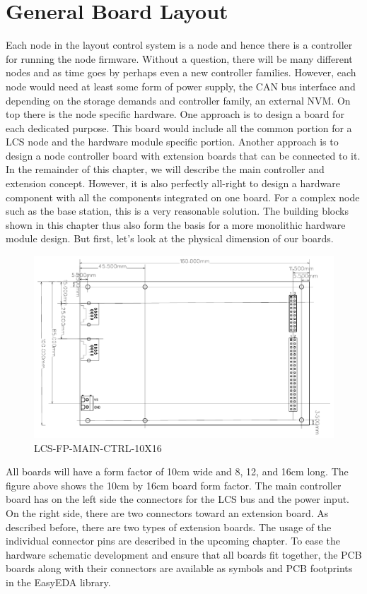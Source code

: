 \section{General Board Layout}

Each node in the layout control system is a node and hence there is a controller for running the node firmware. Without a question, there will be many different nodes and as time goes by perhaps even a new controller families. However, each node would need at least some form of power supply, the CAN bus interface and depending on the storage demands and controller family, an external NVM. On top there is the node specific hardware. One approach is to design a board for each dedicated purpose. This board would include all the common portion for a LCS node and the hardware module specific portion. Another approach is to design a node controller board with extension boards that can be connected to it. In the remainder of this chapter, we will describe the main controller and extension concept. However, it is also perfectly all-right to design a hardware component with all the components integrated on one board. For a complex node such as the base station, this is a very reasonable solution. The building blocks shown in this chapter thus also form the basis for a more monolithic hardware module design. But first, let's look at the physical dimension of our boards.

\begin{figure}[htbp]
    \centering
    \includegraphics[page=1, scale=0.7]{./Figures/LCS-FP-MAIN-CTRL-10X16.pdf}
    \caption{LCS-FP-MAIN-CTRL-10X16}
\end{figure}

All boards will have a form factor of 10cm wide and 8, 12, and 16cm long. The figure above shows the 10cm by 16cm board form factor. The main controller board has on the left side the connectors for the LCS bus and the power input. On the right side, there are two connectors toward an extension board. As described before, there are two types of extension boards. The usage of the individual connector pins are described in the upcoming chapter. To ease the hardware schematic development and ensure that all boards fit together, the PCB boards along with their connectors are available as symbols and PCB footprints in the EasyEDA library.

